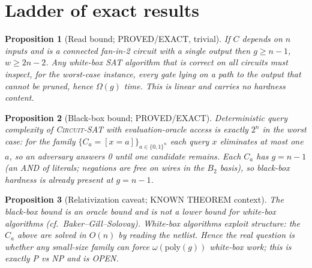 \documentclass[11pt]{article}
\newtheorem{prop}{Proposition}
\newcommand{\SAT}{\textsc{Circuit-SAT}}
\begin{document}
\section{Ladder of exact results}
\begin{prop}[Read bound; PROVED/EXACT, trivial] If $C$ depends on $n$ inputs and is a
connected fan-in-2 circuit with a single output then $g\ge n-1$, $w\ge 2n-2$. Any
white-box SAT algorithm that is correct on all circuits must inspect, for the worst-case
instance, every gate lying on a path to the output that cannot be pruned, hence
$\Omega(g)$ time. This is linear and carries no hardness content.
\end{prop}
\begin{prop}[Black-box bound; PROVED/EXACT] Deterministic query complexity of \SAT{} with
evaluation-oracle access is exactly $2^n$ in the worst case: for the family
$\{C_a=[x=a]\}_{a\in\{0,1\}^n}$ each query $x$ eliminates at most one $a$, so an adversary
answers 0 until one candidate remains. Each $C_a$ has $g=n-1$ (an AND of literals; negations are free
on wires in the $B_2$ basis), so black-box hardness is already present at $g=n-1$.
\end{prop}
\begin{prop}[Relativization caveat; KNOWN THEOREM context] The black-box bound is
an oracle bound and is not a lower bound for white-box algorithms (cf.\ Baker--Gill--Solovay).
White-box algorithms exploit structure: the $C_a$ above are solved in $O(n)$ by reading
the netlist. Hence the real question is whether any \emph{small-size family} can force
$\omega(\mathrm{poly}(g))$ white-box work; this is exactly P vs NP and is OPEN.
\end{prop}
\end{document}
